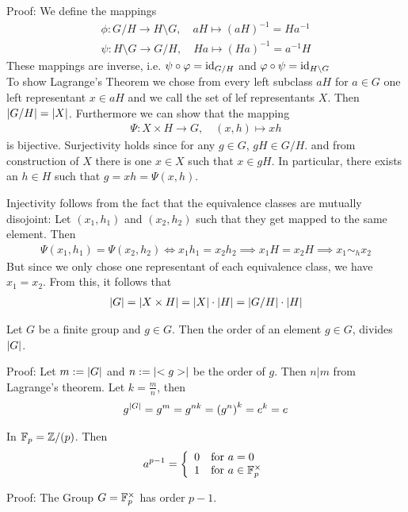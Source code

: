 Proof: We define the mappings
\begin{align*}
	\phi: G/H \to H \setminus G, \quad aH \mapsto (aH)^{-1} = Ha^{-1}\\
	\psi: H \setminus G \to G/H, \quad Ha \mapsto (Ha)^{-1} = a^{-1}H
\end{align*}
These mappings are inverse, i.e. $\psi \circ \varphi = \operatorname{id}_{G/H}$ and $\varphi \circ \psi = \operatorname{id}_{H \setminus G}$\\

To show Lagrange's Theorem we chose from every left subclass $aH$ for $a \in G$ one left representant $x \in aH$ and we call the set of lef representants $X$. Then $\vert G/H\vert = \vert X\vert$. Furthermore we can show that the mapping
\begin{align*}
	\Psi: X \times H \to G, \quad (x,h) \mapsto xh
\end{align*}
is bijective. Surjectivity holds since for any $g \in G$, $gH \in G/H$. and from construction of $X$ there is one $x \in X$ such that $x \in gH$. In particular, there exists an $h \in H$ such that $g = xh = \Psi(x,h)$.

Injectivity follows from the fact that the equivalence classes are mutually disojoint: Let $(x_1,h_1)$ and $(x_2,h_2)$ such that they get mapped to the same element. Then
\begin{align*}
	\Psi(x_1,h_1) = \Psi(x_2,h_2) \iff x_1h_1 = x_2h_2 \implies x_1H = x_2H \implies x_1 \sim_h x_2
\end{align*}
But since we only chose one representant of each equivalence class, we have $x_1 = x_2$.
From this, it follows that
\begin{align*}
	\vert G\vert = \vert X \times H\vert = \vert X\vert \cdot \vert H\vert = \vert G/H\vert \cdot \vert H\vert
\end{align*}
\begin{corollary}[]
	Let $G$ be a finite group and $g \in G$. Then the order of an element $g \in G$, divides $\vert G\vert$.
\end{corollary}
Proof: Let $m := \vert G\vert$ and $n := \abs{<g>}$ be the order of $g$. Then $n|m$ from Lagrange's theorem. Let $k = \frac{m}{n}$, then
\begin{align*}
	g^{\vert G\vert} = g^{m} = g^{nk} = \left(g^{n}\right)^{k} = e^{k} = e
\end{align*}

\begin{corollary}[]
	In $\mathbb{F}_p = \mathbb{Z}/(p)$. Then 
	\begin{align*}
		a^{p-1} = \left\{\begin{array}{ll}
				0 & \text{for } a = 0 \\
			1 & \text{for } a \in \mathbb{F}_p^{\times}
		\end{array} \right.
	\end{align*}
\end{corollary}
Proof: The Group $G = \mathbb{F}_p^{\times}$ has order $p-1$.

